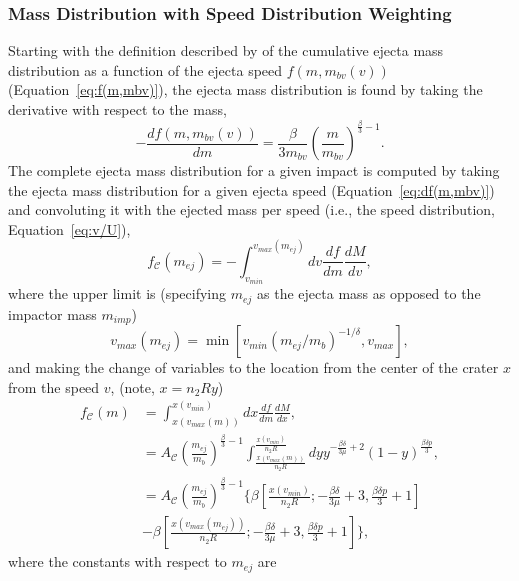 \documentclass{article}
\begin{document}
\subsubsection{Mass Distribution with Speed Distribution Weighting}\label{sssec:Mass Distribution with Speed Distribution Weighting}
Starting with the definition described by \cite{oKeefe1985impact} of the cumulative ejecta mass distribution as a function of the ejecta speed $f(m, m_{bv}(v))$ (Equation~\eqref{eq:f(m,mbv)}), the ejecta mass distribution is found by taking the derivative with respect to the mass,
\begin{equation}\label{eq:df(m,mbv)}
-\frac{df(m, m_{bv}(v))}{dm} = \frac{\beta}{3m_{bv}}\left(\frac{m}{m_{bv}}\right)^{\frac{\beta}{3}-1}.
\end{equation}
The complete ejecta mass distribution for a given impact is computed by taking the ejecta mass distribution for a given ejecta speed (Equation~\eqref{eq:df(m,mbv)}) and convoluting it with the ejected mass per speed (i.e., the speed distribution, Equation~\eqref{eq:v/U}),
\begin{equation}
f_{\mathcal{C}}(m_{ej}) = -\int_{v_{min}}^{v_{max}(m_{ej})}
dv\frac{df}{dm}\frac{dM}{dv},
\end{equation}
where the upper limit is (specifying $m_{ej}$ as the ejecta mass as opposed to the impactor mass $m_{imp}$)
\begin{equation}
v_{max}(m_{ej}) = \min\left[v_{min}(m_{ej}/m_b)^{-1/\delta}, v_{max}\right],
\end{equation}
and making the change of variables to the location from the center of the crater $x$ from the speed $v$, (note, $x = n_2 R y$)
\begin{align} %
f_{\mathcal{C}}(m) &= \int^{x(v_{min})}_{x(v_{max}(m))}
dx\frac{df}{dm}\frac{dM}{dx},\\\nonumber
&= A_\mathcal{C}\left(\frac{m_{ej}}{m_b}\right)^{\frac{\beta}{3}-1}
\int^{\frac{x(v_{min})}{n_2 R}}_{\frac{x(v_{max}(m))}{n_2 R}}
dy y ^{-\frac{\beta\delta}{3\mu}+2}(1-y)^{\frac{\beta\delta p}{3}},\\
&= A_\mathcal{C}\left(\frac{m_{ej}}{m_b}\right)^{\frac{\beta}{3}-1}
\Biggl\{
\beta\left[\frac{x(v_{min})}{n_2 R}; -\frac{\beta\delta}{3\mu}+3, \frac{\beta\delta p}{3} + 1\right]\\\nonumber
& - \beta\left[\frac{x(v_{max}(m_{ej}))}{n_2 R}; -\frac{\beta\delta}{3\mu}+3, \frac{\beta\delta p}{3} + 1\right]
\Biggr\},
\end{align}
where the constants with respect to $m_{ej}$ are
\end{document}
